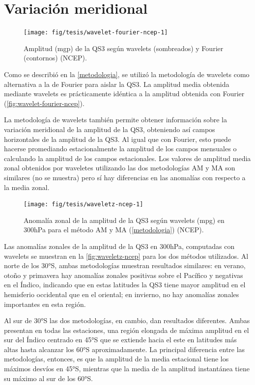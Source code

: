 \documentclass[spanish,a4paper,12pt,oneside]{book}
\begin{document}
\section*{Variación meridional}

\begin{figure}
\texttt{[image: fig/tesis/wavelet-fourier-ncep-1]} \caption{Amplitud (mgp) de la QS3 según wavelets (sombreados) y Fourier (contornos) (NCEP).}\label{fig:wavelet-fourier-ncep}
\end{figure}

Como se describió en la \autoref{metodologia}, se utilizó la metodología
de wavelets como alternativa a la de Fourier para aislar la QS3. La
amplitud media obtenida mediante wavelets es prácticamente idéntica a la
amplitud obtenida con Fourier (\autoref{fig:wavelet-fourier-ncep}).

La metodología de wavelets también permite obtener información sobre la
variación meridional de la amplitud de la QS3, obteniendo así campos
horizontales de la amplitud de la QS3. Al igual que con Fourier, esto
puede hacerse promediando estacionalmente la amplitud de los campos
mensuales o calculando la amplitud de los campos estacionales. Los
valores de amplitud media zonal obtenidos por waveletes utilizando las
dos metodologías AM y MA son similares (no se muestra) pero sí hay
diferencias en las anomalías con respecto a la media zonal.

\begin{figure}

{\centering \texttt{[image: fig/tesis/waveletz-ncep-1]} 

}

\caption{Anomalía zonal de la amplitud de la QS3 según wavelets (mpg) en 300hPa para el método AM y MA (\autoref{metodologia}) (NCEP).}\label{fig:waveletz-ncep}
\end{figure}

Las anomalías zonales de la amplitud de la QS3 en 300hPa, computadas con
wavelets se muestran en la \autoref{fig:waveletz-ncep} para los dos
métodos utilizados. Al norte de los 30°S, ambas metodologías muestran
resultados similares: en verano, otoño y primavera hay anomalías zonales
positivas sobre el Pacífico y negativas en el Índico, indicando que en
estas latitudes la QS3 tiene mayor amplitud en el hemisferio occidental
que en el oriental; en invierno, no hay anomalías zonales importantes en
esta región.

Al sur de 30°S las dos metodologías, en cambio, dan resultados
diferentes. Ambas presentan en todas las estaciones, una región elongada
de máxima amplitud en el sur del Índico centrado en 45°S que se extiende
hacia el este en latitudes más altas hasta alcanzar los 60°S
aproximadamente. La principal diferencia entre las metodologías,
entonces, es que la amplitud de la media estacional tiene los máximos
desvíos en 45°S, mientras que la media de la amplitud instantánea tiene
su máximo al sur de los 60°S.
\end{document}
